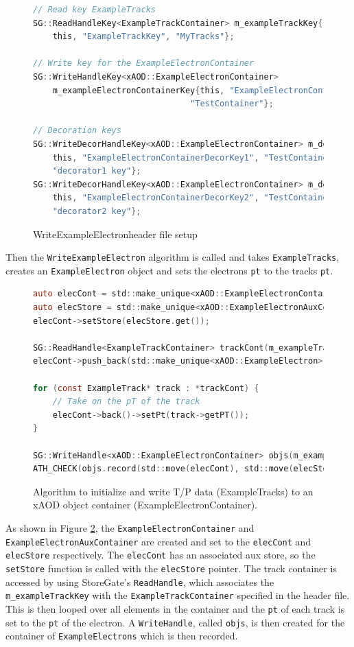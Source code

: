 \begin{figure}[h]
\centering
\begin{lstlisting}[language=C]
// Read key ExampleTracks
SG::ReadHandleKey<ExampleTrackContainer> m_exampleTrackKey{
    this, "ExampleTrackKey", "MyTracks"};  

// Write key for the ExampleElectronContainer
SG::WriteHandleKey<xAOD::ExampleElectronContainer>
    m_exampleElectronContainerKey{this, "ExampleElectronContainerName",
                                "TestContainer"};

// Decoration keys
SG::WriteDecorHandleKey<xAOD::ExampleElectronContainer> m_decor1Key{
    this, "ExampleElectronContainerDecorKey1", "TestContainer.decor1",
    "decorator1 key"};
SG::WriteDecorHandleKey<xAOD::ExampleElectronContainer> m_decor2Key{
    this, "ExampleElectronContainerDecorKey2", "TestContainer.decor2",
    "decorator2 key"};
\end{lstlisting}
\caption{WriteExampleElectronheader file setup}
\label{fig:Mod_utests_WritexAODElectron_header}
\end{figure}

Then the \verb|WriteExampleElectron| algorithm is called and takes \verb|ExampleTracks|, creates an \verb|ExampleElectron| object and sets the electrons \verb|pt| to the tracks \verb|pt|. 
\begin{figure}[h]
\centering
\begin{lstlisting}[language=C]
auto elecCont = std::make_unique<xAOD::ExampleElectronContainer>();
auto elecStore = std::make_unique<xAOD::ExampleElectronAuxContainer>();
elecCont->setStore(elecStore.get());

SG::ReadHandle<ExampleTrackContainer> trackCont(m_exampleTrackKey, ctx);
elecCont->push_back(std::make_unique<xAOD::ExampleElectron>());

for (const ExampleTrack* track : *trackCont) {
    // Take on the pT of the track
    elecCont->back()->setPt(track->getPT());
}

SG::WriteHandle<xAOD::ExampleElectronContainer> objs(m_exampleElectronContainerKey, ctx);
ATH_CHECK(objs.record(std::move(elecCont), std::move(elecStore)));
\end{lstlisting}
\caption{Algorithm to initialize and write T/P data (ExampleTracks) to an xAOD object container (ExampleElectronContainer).}
\label{fig:Mod_utests_WritexAODElectron1}
\end{figure}
As shown in Figure \ref{fig:Mod_utests_WritexAODElectron1}, the \verb|ExampleElectronContainer| and \verb|ExampleElectronAuxContainer| are created and set to the \verb|elecCont| and \verb|elecStore| respectively.
The \verb|elecCont| has an associated aux store, so the \verb|setStore| function is called with the \verb|elecStore| pointer.
The track container is accessed by using StoreGate's \verb|ReadHandle|, which associates the \verb|m_exampleTrackKey| with the \verb|ExampleTrackContainer| specified in the header file.
This is then looped over all elements in the container and the \verb|pt| of each track is set to the \verb|pt| of the electron.
A \verb|WriteHandle|, called \verb|objs|, is then created for the container of \verb|ExampleElectrons| which is then recorded.


